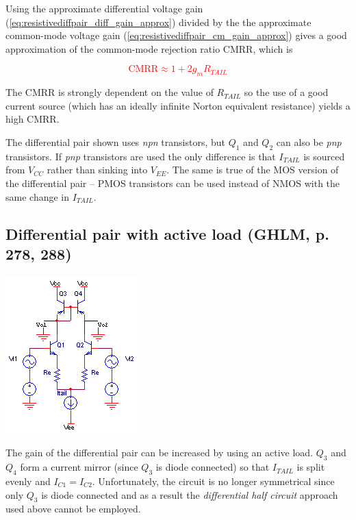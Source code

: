 Using the approximate differential voltage gain (\ref{eq:resistivediffpair_diff_gain_approx}) divided by the the approximate common-mode voltage gain (\ref{eq:resistivediffpair_cm_gain_approx}) gives a good approximation of the common-mode rejection ratio CMRR, which is

\textcolor{red}{
\begin{equation}
\text{CMRR} \approx 1+2g_m R_{TAIL}
\label{eq:resistivediffpair_CMRR}
\end{equation}
}

The CMRR is strongly dependent on the value of $R_{TAIL}$ so the use of a good current source (which has an ideally infinite Norton equivalent resistance) yields a high CMRR.

The differential pair shown uses \textit{npn} transistors, but $Q_{1}$ and $Q_{2}$ can also be \textit{pnp} transistors.
If \textit{pnp} transistors are used the only difference is that $I_{TAIL}$ is sourced from $V_{CC}$ rather than sinking into $V_{EE}$.
The same is true of the MOS version of the differential pair -- PMOS transistors can be used instead of NMOS with the same change in $I_{TAIL}$.

\subsection{Differential pair with active load (GHLM, p. 278, 288)}
\begin{center}
	\includegraphics{schematics/differentialpair_activeload.PNG}
\end{center}
The gain of the differential pair can be increased by using an active load. $Q_{3}$ and $Q_{4}$ form a current mirror (since $Q_{3}$ is diode connected) so that $I_{TAIL}$ is split evenly and $I_{C1} = I_{C2}$. Unfortunately, the circuit is no longer symmetrical since only $Q_{3}$ is diode connected and as a result the \textsl{differential half circuit} approach used above cannot be employed.


